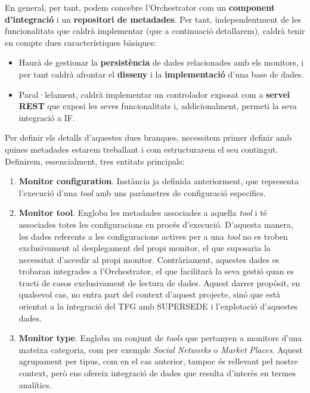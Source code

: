 En general, per tant, podem concebre l'Orchestrator com un \textbf{component d'integració} i un \textbf{repositori de metadades}. Per tant, independentment de les funcionalitats que caldrà implementar (que a continuació detallarem), caldrà tenir en compte dues característiques bàsiques:

\begin{itemize}
\item Haurà de gestionar la \textbf{persistència} de dades relacionades amb els monitors, i per tant caldrà afrontar el \textbf{disseny} i la \textbf{implementació} d'una base de dades.
\item Paral·lelament, caldrà implementar un controlador exposat com a \textbf{servei REST} que exposi les seves funcionalitats i, addicionalment, permeti la seva integració a IF.
\end{itemize}

Per definir els detalls d'aquestes dues branques, necessitem primer definir amb quines metadades estarem treballant i com estructurarem el seu contingut. Definirem, essencialment, tres entitats principals:

\begin{enumerate}
\item \textbf{Monitor configuration}. Instància ja definida anteriorment, que representa l'execució d'una \textit{tool} amb uns paràmetres de configuració específics.
\item \textbf{Monitor tool}. Engloba les metadades associades a aquella \textit{tool} i té associades totes les configuracions en procés d'execució. D'aquesta manera, les dades referents a les configuracions actives per a una \textit{tool} no es troben exclusivament al desplegament del propi monitor, el que suposaria la necessitat d'accedir al propi monitor. Contràriament, aquestes dades es trobaran integrades a l'Orchestrator, el que facilitarà la seva gestió quan es tracti de casos exclusivament de lectura de dades. Aquest darrer propòsit, en qualsevol cas, no entra part del context d'aquest projecte, sinó que està orientat a la integració del TFG amb SUPERSEDE i l'explotació d'aquestes dades.
\item \textbf{Monitor type}. Engloba un conjunt de \textit{tools} que pertanyen a monitors d'una mateixa categoria, com per exemple \textit{Social Networks} o \textit{Market Places}. Aquest agrupament per tipus, com en el cas anterior, tampoc és rellevant pel nostre context, però ens ofereix integració de dades que resulta d'interès en termes analítics.
\end{enumerate}

